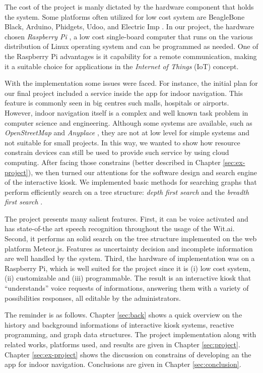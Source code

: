 The cost of the project is manly dictated by the hardware component that holds the system.
Some platforms often utilized for low cost system are BeagleBone Black,  Arduino,  Phidgets, Udoo, and Electric Imp \cite{kubitza2013ingredients,pi2012raspberry}.
In our project, the hardware chosen \emph{Raspberry Pi} \cite{pi2012raspberry}, a low cost single-board computer that runs on the various distribution of Linux operating system and can be programmed as needed.
One of the Raspberry Pi advantages is it capability for a remote communication, making it a suitable choice for applications in the \emph{Internet of Things} (IoT) concept.


With the implementation some issues were faced.
For instance, the initial plan for our final project included a service inside the app for indoor navigation.
This feature is commonly seen in big centres such malls, hospitals or airports.
However, indoor navigation itself is a complex and well known task problem in computer science and engineering.
Although some systems are available, such as \emph{OpenStreetMap} and \emph{Anyplace} \cite{zeinalipour:IEEEIC16}, they are not at low level for simple systems and not suitable for small projects. 
In this way, we wanted to show how resource constrain devices can still be used to provide such service by using cloud computing.
After facing those constrains (better described in Chapter \ref{sec:ex-project}), we then turned our attentions for the software design and search engine of the interactive kiosk.
We implemented basic methods for searching graphs that perform efficiently search on a tree structure: \emph{depth first search} and the \emph{breadth first search} \cite{joyner2010algorithmic}.

The project presents many salient features.
First, it can be voice activated and has state-of-the art speech recognition throughout the usage of the Wit.ai.
Second, it performs an solid search on the tree structure implemented on the web platform Meteor.js.
Features as uncertainty decision and incomplete information are well handled by the system.
Third, the hardware of implementation was on a Raspberry Pi, which is well suited for the project since it is (i) low cost system, (ii) customizable and (iii) programmable.
The result is an interactive kiosk that ``understands'' voice requests of informations, answering them with a variety of possibilities responses, all editable by the administrators.

The reminder is as follows.
Chapter \ref{sec:back} shows a quick overview on the history and background informations of interactive kiosk systems, reactive programming, and graph data structures.
The project implementation along with related works, platforms used, and results are given in Chapter \ref{sec:project}.
Chapter \ref{sec:ex-project} shows the discussion on constrains of developing an the app for indoor navigation.
Conclusions are given in Chapter \ref{sec:conclusion}.

